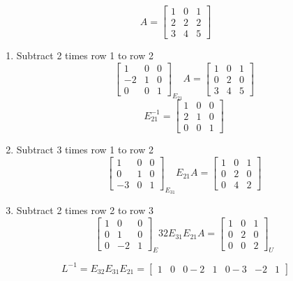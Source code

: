 \documentclass[12pt]{article}
\newcommand{\<}{\langle}
\renewcommand{\>}{\rangle}
\begin{document}
\[
	A = 
	\begin{bmatrix}
		1 & 0 & 1 \\ 
		2 & 2 & 2 \\
		3 & 4 & 5
	\end{bmatrix}
\]

\begin{enumerate}
	\item Subtract 2 times row 1 to row 2
	\[
		\begin{bmatrix}
			1 & 0 & 0 \\ 
			-2 & 1 & 0 \\
			0 & 0 & 1
		\end{bmatrix}_{E_{21}} A =
		\begin{bmatrix}
			1 & 0 & 1 \\ 
			0 & 2 & 0 \\
			3 & 4 & 5
		\end{bmatrix}
	\]
	\[
		E_{21}^{-1} = \begin{bmatrix}
			1 & 0 & 0 \\ 
			2 & 1 & 0 \\
			0 & 0 & 1
		\end{bmatrix}
	\]
	\item Subtract 3 times row 1 to row 2
	\[
		\begin{bmatrix}
			1 & 0 & 0 \\ 
			0 & 1 & 0 \\
			-3 & 0 & 1
		\end{bmatrix}_{E_{31}} E_{21} A =
		\begin{bmatrix}
			1 & 0 & 1 \\ 
			0 & 2 & 0 \\
			0 & 4 & 2
		\end{bmatrix}
	\]
	\item Subtract 2 times row 2 to row 3
	\[
		\begin{bmatrix}
			1 & 0 & 0 \\ 
			0 & 1 & 0 \\
			0 & -2 & 1
		\end{bmatrix}_E{32} E_{31} E_{21} A =
		\begin{bmatrix}
			1 & 0 & 1 \\ 
			0 & 2 & 0 \\
			0 & 0 & 2
		\end{bmatrix}_U
	\]
\end{enumerate}

\[
	L^{-1} = E_{32} E_{31} E_{21} = \begin{bmatrix}
		1 & 0 & 0
		-2 & 1 & 0
		-3 & -2 & 1
	\end{bmatrix}
\]
\end{document}
